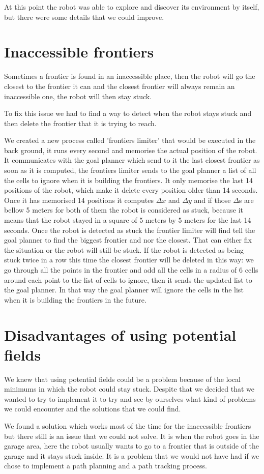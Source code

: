At this point the robot was able to explore and discover its environment by itself, but there were some details that we could improve.

\section{Inaccessible frontiers}

Sometimes a frontier is found in an inaccessible place, then the robot will go the closest to the frontier it can and the closest frontier will always remain an inaccessible one, the robot will then stay stuck.

To fix this issue we had to find a way to detect when the robot stays stuck and then delete the frontier that it is trying to reach.

We created a new process called 'frontiers limiter' that would be executed in the back ground, it runs every second and memorise the actual position of the robot.
It communicates with the goal planner which send to it the last closest frontier as soon as it is computed, the frontiers limiter sends to the goal planner a list of all the cells to ignore when it is building the frontiers.
It only memorise the last 14 positions of the robot, which make it delete every position older than 14 seconds.
Once it has memorised 14 positions it computes $\Delta x$ and $\Delta y$ and if those $\Delta$s are bellow 5 meters for both of them the robot is considered as stuck, because it means that the robot stayed in a square of 5 meters by 5 meters for the last 14 seconds.
Once the robot is detected as stuck the frontier limiter will find tell the goal planner to find the biggest frontier and nor the closest.
That can either fix the situation or the robot will still be stuck.
If the robot is detected as being stuck twice in a row this time the closest frontier will be deleted in this way: we go through all the points in the frontier and add all the cells in a radius of 6 cells around each point to the list of cells to ignore, then it sends the updated list to the goal planner.
In that way the goal planner will ignore the cells in the list when it is building the frontiers in the future.

\section{Disadvantages of using potential fields}

We knew that using potential fields could be a problem because of the local minimums in which the robot could stay stuck.
Despite that we decided that we wanted to try to implement it to try and see by ourselves what kind of problems we could encounter and the solutions that we could find.

We found a solution which works most of the time for the inaccessible frontiers but there still is an issue that we could not solve.
It is when the robot goes in the garage area, here the robot usually wants to go to a frontier that is outside of the garage and it stays stuck inside.
It is a problem that we would not have had if we chose to implement a path planning and a path tracking process.

